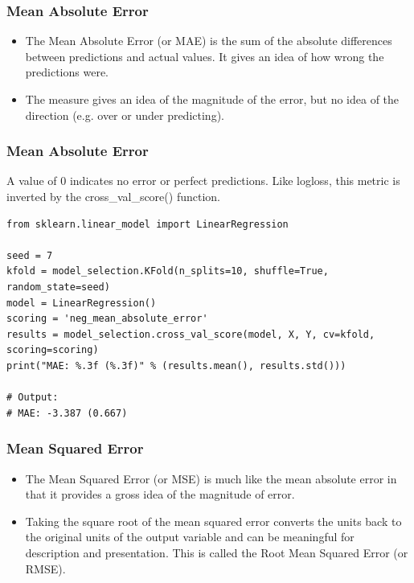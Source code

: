 \begin{frame}[fragile]\frametitle{Mean Absolute Error}

	\begin{itemize}
	\item The Mean Absolute Error (or MAE) is the sum of the absolute differences between predictions and actual values. It gives an idea of how wrong the predictions were.
	\item The measure gives an idea of the magnitude of the error, but no idea of the direction (e.g. over or under predicting).
	\end{itemize}

\end{frame}

\begin{frame}[fragile]\frametitle{Mean Absolute Error}
A value of 0 indicates no error or perfect predictions. Like logloss, this metric is inverted by the cross\_val\_score() function.
\begin{lstlisting}
from sklearn.linear_model import LinearRegression

seed = 7
kfold = model_selection.KFold(n_splits=10, shuffle=True, random_state=seed)
model = LinearRegression()
scoring = 'neg_mean_absolute_error'
results = model_selection.cross_val_score(model, X, Y, cv=kfold, scoring=scoring)
print("MAE: %.3f (%.3f)" % (results.mean(), results.std()))

# Output:
# MAE: -3.387 (0.667)
\end{lstlisting}
\end{frame}


\begin{frame}[fragile]\frametitle{Mean Squared Error}

	\begin{itemize}
	\item The Mean Squared Error (or MSE) is much like the mean absolute error in that it provides a gross idea of the magnitude of error.
	\item Taking the square root of the mean squared error converts the units back to the original units of the output variable and can be meaningful for description and presentation. This is called the Root Mean Squared Error (or RMSE).
	\end{itemize}

\end{frame}

